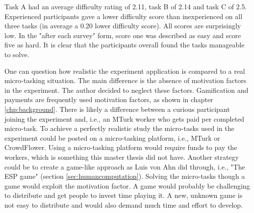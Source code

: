 Task A had an average difficulty rating of 2.11, task B of 2.14 and task C of 2.5. Experienced participants gave a lower difficulty score than inexperienced on all three tasks (in average a 0.20 lower difficulty score). All scores are surprisingly low. In the "after each survey" form, score one was described as easy and score five as hard. It is clear that the participants overall found the tasks manageable to solve. 


One can question how realistic the experiment application is compared to a real micro-tasking situation. The main difference is the absence of motivation factors in the experiment. The author decided to neglect these factors. Gamification and payments are frequently used motivation factors, as shown in chapter \ref{chp:background}. There is likely a difference between a curious participant joining the experiment and, i.e., an MTurk worker who gets paid per completed micro-task. To achieve a perfectly realistic study the micro-tasks used in the experiment could be posted on a micro-tasking platform, i.e., MTurk or CrowdFlower. Using a micro-tasking platform would require funds to pay the workers, which is something this master thesis did not have. Another strategy could be to create a game-like approach as Luis von Ahn did through, i.e., "The ESP game" (section \ref{sec:humancomputation}). Solving the micro-tasks though a game would exploit the motivation factor. A game would probably be challenging to distribute and get people to invest time playing it. A new, unknown game is not easy to distribute and would also demand much time and effort to develop. 


